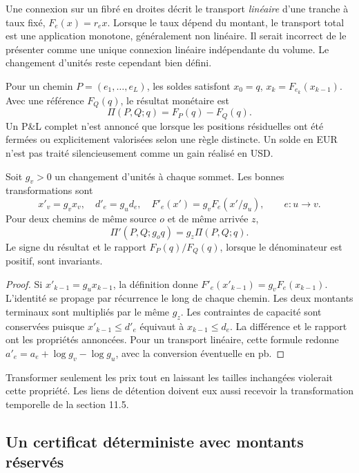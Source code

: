 Une connexion sur un fibré en droites décrit le transport \emph{linéaire} d'une tranche à taux fixé, \(F_e(x)=r_ex\). Lorsque le taux dépend du montant, le transport total est une application monotone, généralement non linéaire. Il serait incorrect de le présenter comme une unique connexion linéaire indépendante du volume. Le changement d'unités reste cependant bien défini.

Pour un chemin \(P=(e_1,\ldots,e_L)\), les soldes satisfont \(x_0=q\), \(x_k=F_{e_k}(x_{k-1})\). Avec une référence \(F_Q(q)\), le résultat monétaire est
\begin{equation}
 \Pi(P,Q;q)=F_P(q)-F_Q(q).
 \label{eq:ext-pnl}
\end{equation}
Un P\&L complet n'est annoncé que lorsque les positions résiduelles ont été fermées ou explicitement valorisées selon une règle distincte. Un solde en EUR n'est pas traité silencieusement comme un gain réalisé en USD.

\begin{proposition}
Soit \(g_v>0\) un changement d'unités à chaque sommet. Les bonnes transformations sont
\begin{equation}
 x'_v=g_vx_v,\quad d'_e=g_ud_e,\quad
 F'_e(x')=g_vF_e(x'/g_u),\qquad e:u\to v.
 \label{eq:ext-money-gauge}
\end{equation}
Pour deux chemins de même source \(o\) et de même arrivée \(z\),
\[
 \Pi'(P,Q;g_oq)=g_z\Pi(P,Q;q).
\]
Le signe du résultat et le rapport \(F_P(q)/F_Q(q)\), lorsque le dénominateur est positif, sont invariants.
\end{proposition}
\begin{proof}
Si \(x'_{k-1}=g_{u}x_{k-1}\), la définition donne \(F'_e(x'_{k-1})=g_vF_e(x_{k-1})\). L'identité se propage par récurrence le long de chaque chemin. Les deux montants terminaux sont multipliés par le même \(g_z\). Les contraintes de capacité sont conservées puisque \(x'_{k-1}\le d'_e\) équivaut à \(x_{k-1}\le d_e\). La différence et le rapport ont les propriétés annoncées. Pour un transport linéaire, cette formule redonne \(a'_e=a_e+\log g_v-\log g_u\), avec la conversion éventuelle en pb.
\end{proof}

Transformer seulement les prix tout en laissant les tailles inchangées violerait cette propriété. Les liens de détention doivent eux aussi recevoir la transformation temporelle de la section 11.5.

\subsection{Un certificat déterministe avec montants réservés}

